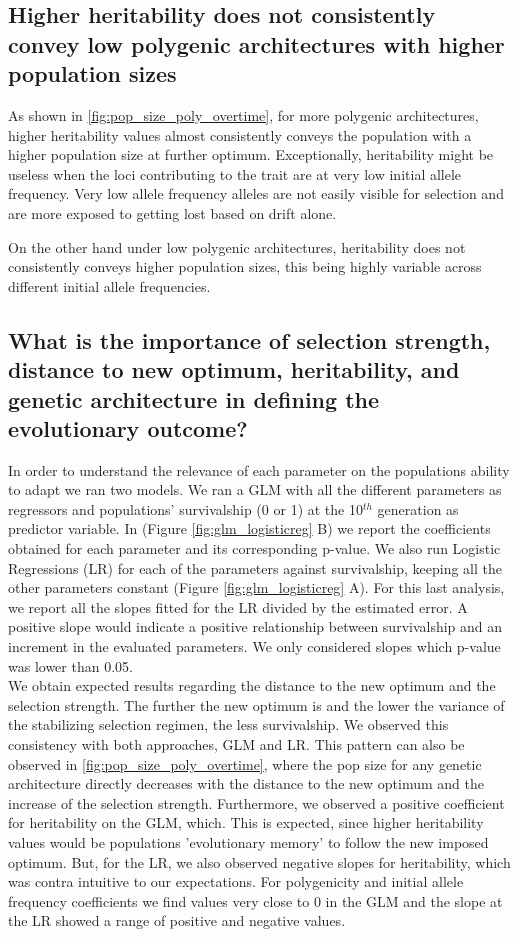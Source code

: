 \documentclass{article}
\begin{document}
\subsection{Higher heritability does not consistently convey low polygenic architectures with higher population sizes}
As shown in \ref{fig:pop_size_poly_overtime}, for more polygenic architectures, higher heritability values almost consistently conveys the population with a higher population size at further optimum. Exceptionally, heritability might be useless when the loci contributing to the trait are at very low initial allele frequency. Very low allele frequency alleles are not easily visible for selection and are more exposed to getting lost based on drift alone. 

On the other hand under low polygenic architectures, heritability does not consistently conveys higher population sizes, this being highly variable across different initial allele frequencies. 

\subsection{What is the importance of selection strength, distance to new optimum, heritability, and genetic architecture in defining the evolutionary outcome?}

In order to understand the relevance of each parameter on the populations ability to adapt we ran two models. We ran a GLM with all the different parameters as regressors and populations' survivalship (0 or 1) at the 10$^{th}$ generation as predictor variable. In (Figure \ref{fig:glm_logisticreg} B) we report the coefficients obtained for each parameter and its corresponding p-value. We also run Logistic Regressions (LR) for each of the parameters against survivalship, keeping all the other parameters constant (Figure \ref{fig:glm_logisticreg} A). For this last analysis, we report all the slopes fitted for the LR divided by the estimated error. A positive slope would indicate a positive relationship between survivalship and an increment in the evaluated parameters. We only considered slopes which p-value was lower than 0.05. 
\\
We obtain expected results regarding the distance to the new optimum and the selection strength. The further the new optimum is and the lower the variance of the stabilizing selection regimen,  the less survivalship. We observed this consistency with both approaches, GLM and LR. This pattern can also be observed in \ref{fig:pop_size_poly_overtime}, where the pop size for any genetic architecture directly decreases with the distance to the new optimum and the increase of the selection strength. Furthermore, we observed a positive coefficient for heritability on the GLM, which. This is expected, since higher heritability values would be populations 'evolutionary memory' to follow the new imposed optimum. But, for the LR, we also observed negative slopes for heritability, which was contra intuitive to our expectations. For polygenicity and initial allele frequency coefficients we find values very close to 0 in the GLM and the slope at the LR showed a range of positive and negative values. 
\end{document}
